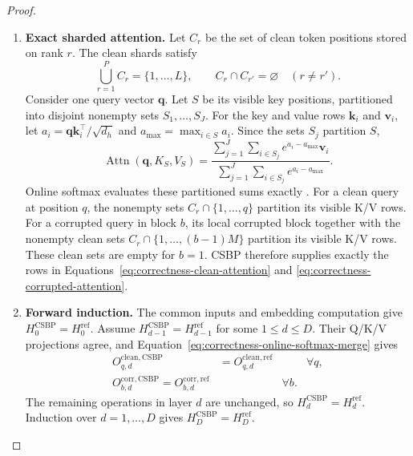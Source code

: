 \begin{proof}
\begin{enumerate}
\item
\textbf{Exact sharded attention.}
Let $C_r$ be the set of clean token positions stored on rank $r$. The clean
shards satisfy
\begin{equation}
    \bigcup_{r=1}^{P} C_r=\{1,\ldots,L\},
    \qquad
    C_r\cap C_{r'}=\varnothing \quad (r\neq r').
    \label{eq:correctness-clean-partition}
\end{equation}
Consider one query vector $\mathbf q$. Let $S$ be its visible key positions,
partitioned into disjoint nonempty sets $S_1,\ldots,S_J$. For the key and value
rows $\mathbf k_i$ and $\mathbf v_i$, let
$a_i=\mathbf q\mathbf k_i^\top/\sqrt{d_h}$ and
$a_{\max}=\max_{i\in S}a_i$. Since the sets $S_j$ partition $S$,
\begin{equation}
    \operatorname{Attn}(\mathbf q,K_S,V_S)
    =
    \frac{\displaystyle\sum_{j=1}^{J}\sum_{i\in S_j}
          e^{a_i-a_{\max}}\mathbf v_i}
         {\displaystyle\sum_{j=1}^{J}\sum_{i\in S_j}e^{a_i-a_{\max}}}.
    \label{eq:correctness-online-softmax-merge}
\end{equation}
Online softmax evaluates these partitioned sums exactly
\citep{milakov2018online,dao2022flashattention}. For a clean query at position
$q$, the nonempty sets $C_r\cap\{1,\ldots,q\}$ partition its visible K/V rows.
For a corrupted query in block $b$, its local corrupted block together with
the nonempty clean sets $C_r\cap\{1,\ldots,(b-1)M\}$ partition its visible
K/V rows. These clean sets are empty for $b=1$.
CSBP therefore supplies exactly the rows in
Equations~\ref{eq:correctness-clean-attention} and
\ref{eq:correctness-corrupted-attention}.

\item
\textbf{Forward induction.}
The common inputs and embedding computation give
$H_0^{\mathrm{CSBP}}=H_0^{\mathrm{ref}}$. Assume
$H_{d-1}^{\mathrm{CSBP}}=H_{d-1}^{\mathrm{ref}}$ for some
$1\leq d\leq D$. Their Q/K/V projections agree, and
Equation~\ref{eq:correctness-online-softmax-merge} gives
\begin{equation}
    \begin{aligned}
      O_{q,d}^{\mathrm{clean,CSBP}}&=O_{q,d}^{\mathrm{clean,ref}}
      && \forall q,\\
      O_{b,d}^{\mathrm{corr,CSBP}}=O_{b,d}^{\mathrm{corr,ref}}
      && \forall b.
    \end{aligned}
    \label{eq:correctness-forward-step}
\end{equation}
The remaining operations in layer $d$ are unchanged, so
$H_d^{\mathrm{CSBP}}=H_d^{\mathrm{ref}}$. Induction over
$d=1,\ldots,D$ gives $H_D^{\mathrm{CSBP}}=H_D^{\mathrm{ref}}$.


\end{enumerate}
\end{proof}
